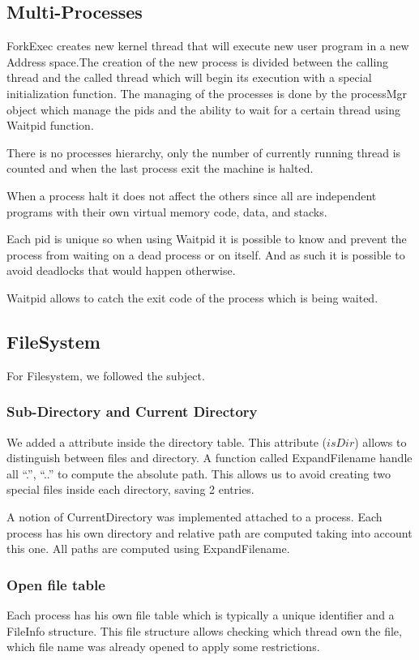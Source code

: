 \subsection{Multi-Processes}
ForkExec creates new kernel thread that will execute new user program in a new
Address space.The creation of the new process is divided between the calling
thread and the called thread which will begin its execution with a special
initialization function. The managing of the processes is done by the processMgr
object which manage the pids and the ability to wait for a certain thread using
Waitpid function.

There is no processes hierarchy, only the number of currently running thread is
counted and when the last process exit the machine is halted.

When a process halt it does not affect the others since all are independent
programs with their own virtual memory code, data, and stacks.

Each pid is unique so when using Waitpid it is possible to know and prevent the
process from waiting on a dead process or on itself. And as such it is possible
to avoid deadlocks that would happen otherwise.

Waitpid allows to catch the exit code of the process which is being waited.

\subsection{FileSystem}
For Filesystem, we followed the subject.

\subsubsection{Sub-Directory and Current Directory}

We added a attribute inside the directory table. This attribute ($isDir$) allows
to distinguish between files and directory. A function called
\textrm{ExpandFilename} handle all ``.'', ``..'' to compute the absolute
path. This allows us to avoid creating two special files inside each directory,
saving 2 entries.

A notion of CurrentDirectory was implemented attached to a process. Each process
has his own directory and relative path are computed taking into account this
one. All paths are computed using ExpandFilename.

\subsubsection{Open file table}
Each process has his own file table which is typically a unique identifier and a
FileInfo structure. This file structure allows checking which thread own the
file, which file name was already opened to apply some restrictions.

